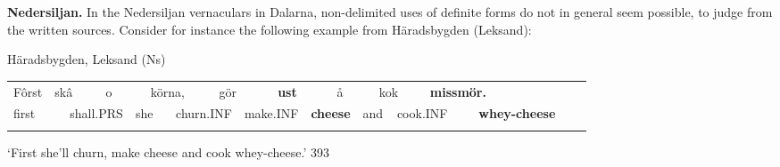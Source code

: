 \begin{styleBodytextC}
\textbf{Nedersiljan.} In the Nedersiljan vernaculars in Dalarna, non-delimited uses of definite forms do not in general seem possible, to judge from the written sources. Consider for instance the following example from Häradsbygden (Leksand):

\end{styleBodytextC}

\begin{listWWNumileveli}
\item 

\begin{styleExample}
Häradsbygden, Leksand (Ns) 

\end{styleExample}

\end{listWWNumileveli}

\begin{tabular}{llllllllllllllllllll}
\lsptoprule
Fôrst & \multicolumn{2}{l}{skâ

} & \multicolumn{2}{l}{o

} & \multicolumn{2}{l}{körna,

} & \multicolumn{2}{l}{gör

} & \multicolumn{2}{l}{{\bfseries ust}

} & \multicolumn{2}{l}{å

} & \multicolumn{2}{l}{kok

} & \multicolumn{2}{l}{{\bfseries missmör.}

} & \multicolumn{2}{l}{} & \\
\multicolumn{2}{l}{first

} & \multicolumn{2}{l}{shall.PRS

} & \multicolumn{2}{l}{she

} & \multicolumn{2}{l}{churn.INF

} & \multicolumn{2}{l}{make.INF

} & \multicolumn{2}{l}{{\bfseries cheese}

} & \multicolumn{2}{l}{and

} & \multicolumn{2}{l}{cook.INF

} & \multicolumn{2}{l}{{\bfseries whey-cheese}

} & \multicolumn{2}{l}{}\\
\lspbottomrule
\end{tabular}

\begin{styleTranslation}
‘First she’ll churn, make cheese and cook whey-cheese.’ 393

\end{styleTranslation}

